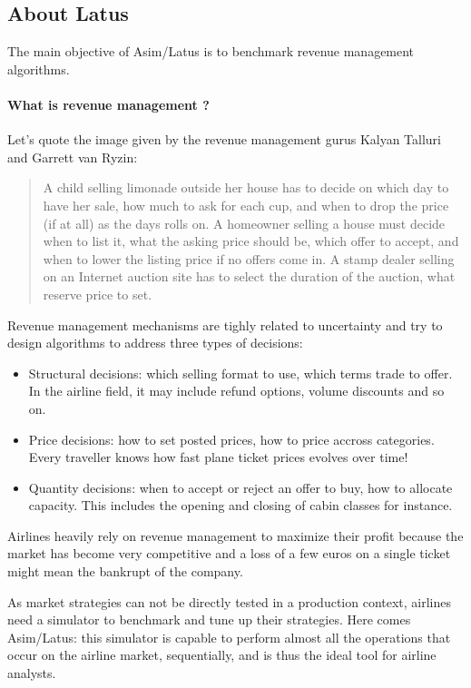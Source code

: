 \documentclass[11pt]{JHEP3}
\begin{document}
\subsection{About Latus}


The main objective of Asim/Latus is to benchmark revenue management algorithms. 

\paragraph{What is revenue management ?} Let's quote the image given by the revenue management gurus Kalyan Talluri and Garrett van Ryzin:

\begin{quote}
A child selling limonade outside her house has to decide on which day
to have her sale, how much to ask for each cup, and when to drop the
price (if at all) as the days rolls on. A homeowner selling a house
must decide when to list it, what the asking price should be, which
offer to accept, and when to lower the listing price if no offers come
in. A stamp dealer selling on an Internet auction site has to select
the duration of the auction, what reserve price to set.
\end{quote} 

Revenue management mechanisms are tighly related to uncertainty and
try to design algorithms to address three types of decisions:

\begin{itemize}
\item Structural decisions: which selling format to use, which terms
  trade to offer. In the airline field, it may include refund options,
  volume discounts and so on.
\item Price decisions: how to set posted prices, how to price accross
  categories. Every traveller knows how fast plane ticket prices
  evolves over time!
\item Quantity decisions: when to accept or reject an offer to buy,
  how to allocate capacity. This includes the opening and closing of
  cabin classes for instance.
\end{itemize}

Airlines heavily rely on revenue management to maximize their profit
because the market has become very competitive and a loss of a few
euros on a single ticket might mean the bankrupt of the company.

As market strategies can not be directly tested in a production context,
airlines need a simulator to benchmark and tune up their
strategies. Here comes Asim/Latus: this simulator is capable to perform
almost all the operations that occur on the airline market,
sequentially, and is thus the ideal tool for airline analysts.
\end{document}
